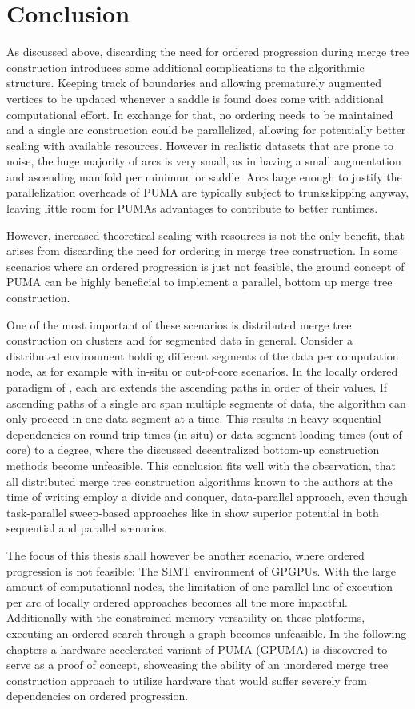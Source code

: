 \documentclass[%
	paper=A4,					%
	twoside=true,				%
	openright,					%
	parskip=full,				%
	chapterprefix=true,			%
	11pt,						%
	headings=normal,			%
	bibliography=totoc,			%
	listof=totoc,				%
	titlepage=on,				%
	captions=tableabove,		%
	draft=false,				%
]{scrreprt}%
\begin{document}
\section{Conclusion}
As discussed above, discarding the need for ordered progression during merge tree construction introduces some additional complications to the algorithmic structure. Keeping track of boundaries and allowing prematurely augmented vertices to be updated whenever a saddle is found does come with additional computational effort. In exchange for that, no ordering needs to be maintained and a single arc construction could be parallelized, allowing for potentially better scaling with available resources. However in realistic datasets that are prone to noise, the huge majority of arcs is very small, as in having a small augmentation and ascending manifold per minimum or saddle. Arcs large enough to justify the parallelization overheads of PUMA are typically subject to trunkskipping anyway, leaving little room for PUMAs advantages to contribute to better runtimes. 

However, increased theoretical scaling with resources is not the only benefit, that arises from discarding the need for ordering in merge tree construction. In some scenarios where an ordered progression is just not feasible, the ground concept of PUMA can be highly beneficial to implement a parallel, bottom up merge tree construction. 

One of the most important of these scenarios is distributed merge tree construction on clusters and for segmented data in general. Consider a distributed environment holding different segments of the data per computation node, as for example with in-situ or out-of-core scenarios. In the locally ordered paradigm of \cite{FTM}, each arc extends the ascending paths in order of their values. If ascending paths of a single arc span multiple segments of data, the algorithm can only proceed in one data segment at a time. This results in heavy sequential dependencies on round-trip times (in-situ) or data segment loading times (out-of-core) to a degree, where the discussed decentralized bottom-up construction methods become unfeasible. This conclusion fits well with the observation, that all distributed merge tree construction algorithms known to the authors at the time of writing employ a divide and conquer, data-parallel approach, even though task-parallel sweep-based approaches like in \cite{FTM} show superior potential in both sequential and parallel scenarios. 

The focus of this thesis shall however be another scenario, where ordered progression is not feasible: The SIMT environment of GPGPUs. With the large amount of computational nodes, the limitation of one parallel line of execution per arc of locally ordered approaches becomes all the more impactful. Additionally with the constrained memory versatility on these platforms, executing an ordered search through a graph becomes unfeasible. In the following chapters a hardware accelerated variant of PUMA (GPUMA) is discovered to serve as a proof of concept, showcasing the ability of an unordered merge tree construction approach to utilize hardware that would suffer severely from dependencies on ordered progression. 
\end{document}
